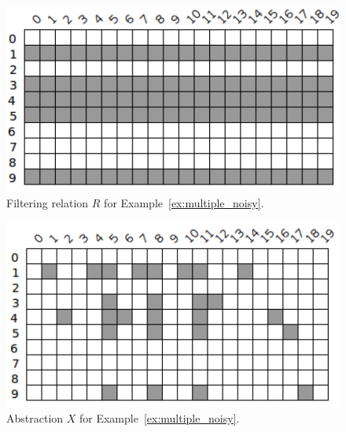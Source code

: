 \begin{example}
	\begin{figure}[ht]
		\centering
		\includegraphics[scale=0.65]{Figures/PDF/Relview/R.pdf}
		\caption{Filtering relation $R$ for Example~\ref{ex:multiple_noisy}.}
		\label{fig:multiple_noisy_r}
	\end{figure}

	\begin{figure}[ht]
		\centering
		\includegraphics[scale=0.65]{Figures/PDF/Relview/XX.pdf}
		\caption{Abstraction $X$ for Example~\ref{ex:multiple_noisy}.}
		\label{fig:multiple_noisy_x}
	\end{figure}
	
\end{example}